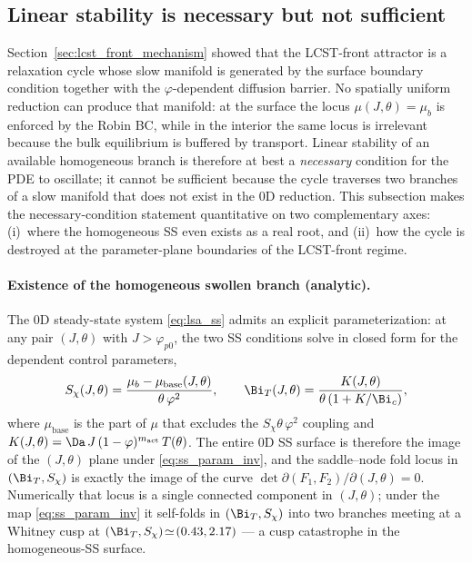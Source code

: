 
\subsection{Linear stability is necessary but not sufficient}
\label{sec:lsa_vs_nl}

Section~\ref{sec:lcst_front_mechanism} showed that the LCST-front
attractor is a relaxation cycle whose slow manifold is generated by
the surface boundary condition together with the
$\varphi$-dependent diffusion barrier.  No spatially uniform reduction
can produce that manifold: at the surface the locus
$\mu(J,\theta)=\mu_b$ is enforced by the Robin BC, while in the
interior the same locus is irrelevant because the bulk equilibrium is
buffered by transport.  Linear stability of an available homogeneous
branch is therefore at best a \emph{necessary} condition for the PDE
to oscillate; it cannot be sufficient because the cycle traverses
two branches of a slow manifold that does not exist in the 0D
reduction.  This subsection makes the necessary-condition statement
quantitative on two complementary axes: (i)~where the homogeneous SS
even exists as a real root, and (ii)~how the cycle is destroyed at
the parameter-plane boundaries of the LCST-front regime.

\paragraph{Existence of the homogeneous swollen branch (analytic).}
The 0D steady-state system \eqref{eq:lsa_ss} admits an explicit
parameterization: at any pair $(J,\theta)$ with $J>\varphi_{p0}$,
the two SS conditions solve in closed form for the dependent
control parameters,
\begin{equation}
  S_\chi(J,\theta) =
    \frac{\mu_b - \mu_{\mathrm{base}}(J,\theta)}{\theta\,\varphi^2}, \qquad
  \Bi_T(J,\theta) = \frac{K(J,\theta)}{\theta\,(1+K/\Bi_c)},
  \label{eq:ss_param_inv}
\end{equation}
where $\mu_{\mathrm{base}}$ is the part of $\mu$ that excludes the
$S_\chi\theta\,\varphi^2$ coupling and
$K(J,\theta)=\Da\,J\,(1-\varphi)^{m_\mathrm{act}}\,T(\theta)$.  The
entire 0D SS surface is therefore the image of the $(J,\theta)$ plane
under \eqref{eq:ss_param_inv}, and the saddle--node fold locus in
$(\Bi_T, S_\chi)$ is exactly the image of the curve
$\det\partial(F_1,F_2)/\partial(J,\theta)=0$.  Numerically that locus
is a single connected component in $(J,\theta)$; under the map
\eqref{eq:ss_param_inv} it self-folds in $(\Bi_T,S_\chi)$ into two
branches meeting at a Whitney cusp at
$(\Bi_T,S_\chi)\!\simeq\!(0.43, 2.17)$ — a cusp catastrophe in the
homogeneous-SS surface.

